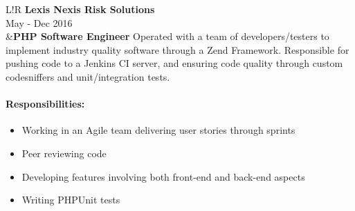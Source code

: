 \documentclass[10pt]{article}
\newcommand\VRule{\color{lightgray}\vrule width 0.5pt}
\begin{document}
\begin{longtable}{L!{\VRule}R}
{\bf Lexis Nexis Risk Solutions}\\
May - Dec 2016\\
&{\bf PHP Software Engineer}\newline
Operated with a team of developers/testers to implement industry quality software through a Zend Framework. Responsible for pushing code to a Jenkins CI server, and ensuring code quality through custom codesniffers and unit/integration tests.

\vspace{-3mm}
\paragraph{Responsibilities:}
\begin{itemize}[noitemsep,topsep=0pt]
    \item Working in an Agile team delivering user stories through sprints
    \item Peer reviewing code
    \item Developing features involving both front-end and back-end aspects
    \item Writing PHPUnit tests
\end{itemize}
\end{longtable}

\end{document}

